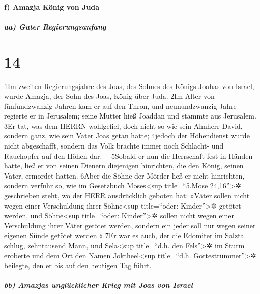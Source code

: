 \hypertarget{f-amazja-kuxf6nig-von-juda}{%
\paragraph{f) Amazja König von Juda}\label{f-amazja-kuxf6nig-von-juda}}

\hypertarget{aa-guter-regierungsanfang}{%
\subparagraph{aa) Guter
Regierungsanfang}\label{aa-guter-regierungsanfang}}

\hypertarget{section-13}{%
\section{14}\label{section-13}}

1Im zweiten Regierungsjahre des Joas, des Sohnes des Königs Joahas von
Israel, wurde Amazja, der Sohn des Joas, König über Juda. 2Im Alter von
fünfundzwanzig Jahren kam er auf den Thron, und neunundzwanzig Jahre
regierte er in Jerusalem; seine Mutter hieß Joaddan und stammte aus
Jerusalem. 3Er tat, was dem HERRN wohlgefiel, doch nicht so wie sein
Ahnherr David, sondern ganz, wie sein Vater Joas getan hatte; 4jedoch
der Höhendienst wurde nicht abgeschafft, sondern das Volk brachte immer
noch Schlacht- und Rauchopfer auf den Höhen dar.~-- 5Sobald er nun die
Herrschaft fest in Händen hatte, ließ er von seinen Dienern diejenigen
hinrichten, die den König, seinen Vater, ermordet hatten. 6Aber die
Söhne der Mörder ließ er nicht hinrichten, sondern verfuhr so, wie im
Gesetzbuch Moses\textless sup title=``5.Mose 24,16''\textgreater✲
geschrieben steht, wo der HERR ausdrücklich geboten hat: »Väter sollen
nicht wegen einer Verschuldung ihrer Söhne\textless sup title=``oder:
Kinder''\textgreater✲ getötet werden, und Söhne\textless sup
title=``oder: Kinder''\textgreater✲ sollen nicht wegen einer
Verschuldung ihrer Väter getötet werden, sondern ein jeder soll nur
wegen seiner eigenen Sünde getötet werden.« 7Er war es auch, der die
Edomiter im Salztal schlug, zehntausend Mann, und Sela\textless sup
title=``d.h. den Fels''\textgreater✲ im Sturm eroberte und dem Ort den
Namen Joktheel\textless sup title=``d.h. Gottestrümmer''\textgreater✲
beilegte, den er bis auf den heutigen Tag führt.

\hypertarget{bb-amazjas-ungluxfccklicher-krieg-mit-joas-von-israel}{%
\subparagraph{bb) Amazjas unglücklicher Krieg mit Joas von
Israel}\label{bb-amazjas-ungluxfccklicher-krieg-mit-joas-von-israel}}

